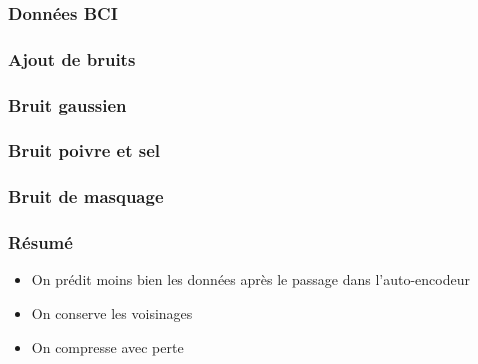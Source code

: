 \documentclass{beamer}
\begin{document}
\begin{frame}
\frametitle{Données BCI}

\end{frame}

\begin{frame}
\frametitle{Ajout de bruits}

\end{frame}
\begin{frame}
\frametitle{Bruit gaussien}

\end{frame}

\begin{frame}
\frametitle{Bruit poivre et sel}

\end{frame}

\begin{frame}
\frametitle{Bruit de masquage}

\end{frame}

\begin{frame}
\frametitle{Résumé}
\begin{itemize}
    \item On prédit moins bien les données après le passage dans l'auto-encodeur
    \item On conserve les voisinages
    \item On compresse avec perte
\end{itemize}
\end{frame}


\end{document}
